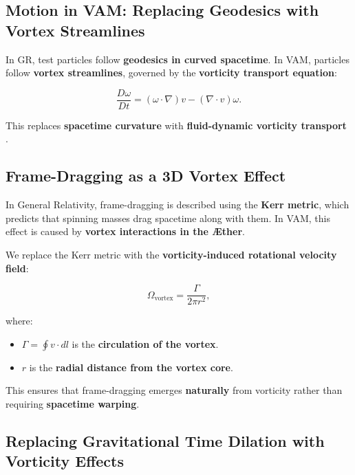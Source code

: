 \subsection*{Motion in VAM: Replacing Geodesics with Vortex Streamlines}

In GR, test particles follow \textbf{geodesics in curved spacetime}. In VAM, particles follow \textbf{vortex streamlines}, governed by the \textbf{vorticity transport equation}:

\begin{equation*}
    \frac{D\omega}{Dt} = (\omega \cdot \nabla) v - (\nabla \cdot v) \omega.
\end{equation*}

This replaces \textbf{spacetime curvature} with \textbf{fluid-dynamic vorticity transport} \cite{lamb_hydrodynamics, feynman_superfluid}.



\subsection*{Frame-Dragging as a 3D Vortex Effect}

In General Relativity, frame-dragging is described using the \textbf{Kerr metric}, which predicts that spinning masses drag spacetime along with them. In VAM, this effect is caused by \textbf{vortex interactions in the Æther}.

We replace the Kerr metric with the \textbf{vorticity-induced rotational velocity field}:

\begin{equation*}
    \Omega_\text{vortex} = \frac{\Gamma}{2\pi r^2},
\end{equation*}

where:
\begin{itemize}
    \item \( \Gamma = \oint v \cdot dl \) is the \textbf{circulation of the vortex}.
    \item \( r \) is the \textbf{radial distance from the vortex core}.
\end{itemize}

This ensures that frame-dragging emerges \textbf{naturally} from vorticity rather than requiring \textbf{spacetime warping}.



\subsection*{Replacing Gravitational Time Dilation with Vorticity Effects}

